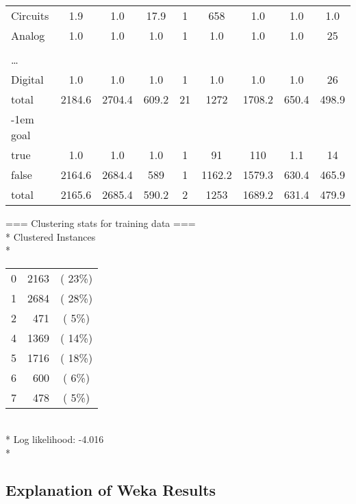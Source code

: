 \begin{tabular}{lcccccccc}
Circuits&1.9&1.0&17.9&1&658&1.0&1.0&1.0\\
Analog&1.0&1.0&1.0&1&1.0&1.0&1.0&25\\ 
\\ \ldots \\
Digital&1.0&1.0&1.0&1&1.0&1.0&1.0&26\\
total&2184.6&2704.4&609.2&21&1272&1708.2&650.4&498.9\\
\kern-1em goal\\ 
true&1.0&1.0&1.0&1&91&110&1.1&14\\
false&2164.6&2684.4&589&1&1162.2&1579.3&630.4&465.9\\ 
total&2165.6&2685.4&590.2&2&1253&1689.2&631.4&479.9\\
\end{tabular}
=== Clustering stats for training data ===\\*
Clustered Instances\\*
\begin{tabular}{lrc} 
0&2163&( 23\%)\\*
1&2684&( 28\%)\\*
2&471&(  5\%)\\*
4&1369&( 14\%)\\*
5&1716&( 18\%)\\*
6&600&(  6\%)\\*
7&478&(  5\%)\\*
\end{tabular}
\\*
\noindent Log likelihood: -4.016\\*

\subsection{Explanation of Weka Results}

